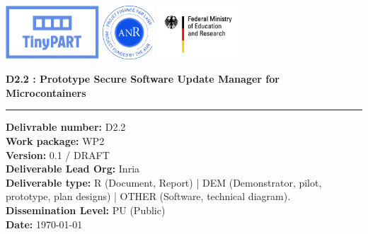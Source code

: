 \begin{titlepage}
		
			
			
			\includegraphics[height=2cm]{titlepage/Logo_TinyPART.pdf}
			\includegraphics[height=2cm]{titlepage/anr-projet-logo.jpg}
			\includegraphics[height=2cm]{titlepage/logo-bmbf.jpg}
			
			\vspace{0.5cm}

			
			\begin{center}
				\huge \bfseries D2.2 : Prototype Secure Software Update Manager for Microcontainers
				\vspace{0.5cm}
				
				\rule{0.5\linewidth}{1pt}
			\end{center}
			
			\vspace{0.5cm}
					

			\textbf{Delivrable number: } D2.2\\
			\textbf{Work package: } WP2\\							
			\textbf{Version:} 0.1 / DRAFT\\
			\textbf{Deliverable Lead Org:} Inria\\
			\textbf{Deliverable type:} R (Document, Report) | DEM (Demonstrator, pilot, prototype, plan designs) | OTHER (Software, technical diagram).\\
			\textbf{Dissemination Level:} PU (Public) \\ %
			\textbf{Date: } \today\\


\end{titlepage}
